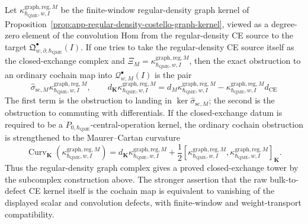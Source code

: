 \begin{prop}
\label{prop:wt-raw-kappa-cochain-obstruction}
  Let
  \(\kappa^{\mathrm{graph,reg},M}_{\hbar_{\mathrm{QME}},w,I}\) be the finite-window
  regular-density graph kernel of
  Proposition~\ref{prop:app-regular-density-costello-graph-kernel},
  viewed as a degree-zero element of the convolution Hom from the
  regular-density CE source to the target
  \(\mathfrak Q^\bullet_{w,\partial,\hbar_{\mathrm{QME}}}(I)\).  If one tries to take the
  regular-density CE source itself as the closed-exchange complex and
  \(\Xi_M=\kappa^{\mathrm{graph,reg},M}_{\hbar_{\mathrm{QME}},w,I}\), then the exact
  obstruction to an ordinary cochain map into
  \(\mathcal Q^\bullet_{w,M}(I)\) is the pair
  \[
    \widehat\sigma_{\mathrm{sc},M}
      \kappa^{\mathrm{graph,reg},M}_{\hbar_{\mathrm{QME}},w,I},
    \qquad
    d_{\mathbf K}\kappa^{\mathrm{graph,reg},M}_{\hbar_{\mathrm{QME}},w,I}
      =
      d_M\kappa^{\mathrm{graph,reg},M}_{\hbar_{\mathrm{QME}},w,I}
      -
      \kappa^{\mathrm{graph,reg},M}_{\hbar_{\mathrm{QME}},w,I}d_{\mathrm{CE}}
  \]
  The first term is the obstruction to landing in
  \(\ker\widehat\sigma_{\mathrm{sc},M}\); the second is the obstruction
  to commuting with differentials.  If the closed-exchange datum
  is required to be a \(P_{0,\hbar_{\mathrm{QME}}}\)-central-operation kernel, the
  ordinary cochain obstruction is strengthened to the Maurer--Cartan
  curvature
  \[
    \operatorname{Curv}_{\mathbf K}
      (\kappa^{\mathrm{graph,reg},M}_{\hbar_{\mathrm{QME}},w,I})
      =
      d_{\mathbf K}\kappa^{\mathrm{graph,reg},M}_{\hbar_{\mathrm{QME}},w,I}
      +\frac12[
        \kappa^{\mathrm{graph,reg},M}_{\hbar_{\mathrm{QME}},w,I},
        \kappa^{\mathrm{graph,reg},M}_{\hbar_{\mathrm{QME}},w,I}
      ]_{\mathbf K}.
  \]
  Thus the regular-density graph complex gives a proved
  closed-exchange tower by the subcomplex construction above.  The
  stronger assertion that the raw bulk-to-defect CE kernel itself is the
  cochain map is equivalent to vanishing of the displayed scalar and
  convolution defects, with finite-window and weight-transport
  compatibility.
\end{prop}

